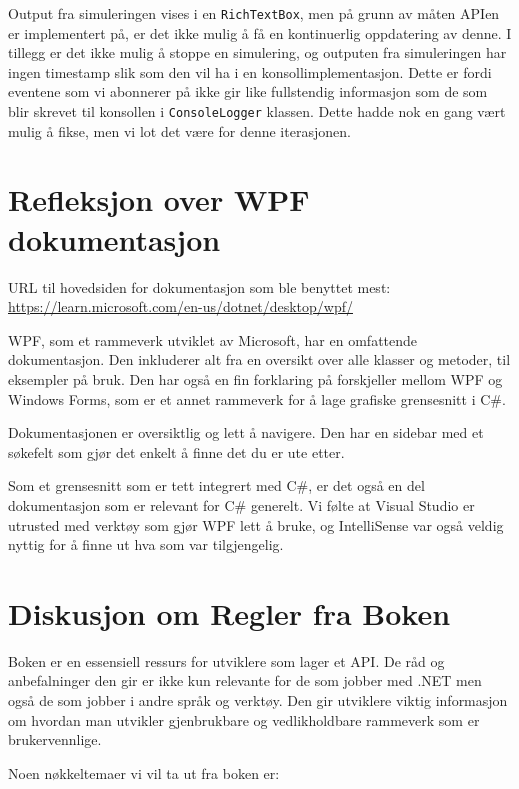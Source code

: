 \documentclass[12pt]{article}
\begin{document}
Output fra simuleringen vises i en \texttt{RichTextBox}, men på grunn av måten APIen er implementert på, 
er det ikke mulig å få en kontinuerlig oppdatering av denne. I tillegg er det ikke mulig å stoppe en simulering,
og outputen fra simuleringen har ingen timestamp slik som den vil ha i en konsollimplementasjon. Dette er fordi eventene
som vi abonnerer på ikke gir like fullstendig informasjon som de som blir skrevet til konsollen i \texttt{ConsoleLogger} 
klassen. Dette hadde nok en gang vært mulig å fikse, men vi lot det være for denne iterasjonen.

\section{Refleksjon over WPF dokumentasjon}
URL til hovedsiden for dokumentasjon som ble benyttet mest: \url{https://learn.microsoft.com/en-us/dotnet/desktop/wpf/}

WPF, som et rammeverk utviklet av Microsoft, har en omfattende dokumentasjon. Den inkluderer
alt fra en oversikt over alle klasser og metoder, til eksempler på bruk. Den har også en fin
forklaring på forskjeller mellom WPF og Windows Forms, som er et annet rammeverk for å lage
grafiske grensesnitt i C\#.

Dokumentasjonen er oversiktlig og lett å navigere. Den har en sidebar med et søkefelt som gjør det
enkelt å finne det du er ute etter.

Som et grensesnitt som er tett integrert med C\#, er det også en del dokumentasjon som er relevant
for C\# generelt. Vi følte at Visual Studio er utrusted med verktøy
som gjør WPF lett å bruke, og IntelliSense var også veldig nyttig for å finne ut hva som var tilgjengelig.

\section{Diskusjon om Regler fra Boken}

Boken er en essensiell ressurs for utviklere som lager et API. De råd og anbefalninger den gir er ikke kun 
relevante for de som jobber med .NET men også de som jobber i andre språk og verktøy. Den gir utviklere viktig
informasjon om hvordan man utvikler gjenbrukbare og vedlikholdbare rammeverk som er brukervennlige. 

Noen nøkkeltemaer vi vil ta ut fra boken er:
\end{document}
